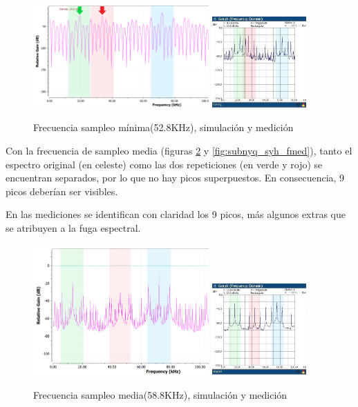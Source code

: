 \documentclass[../../ASSD_TP1_G7.tex]{subfiles}
\begin{document}
\begin{figure}[H]
\centering
{}
{\includegraphics[width=0.6\textwidth]{figures/simpto_8_syh_52,8_espectro.png}}
{\includegraphics[width=0.32\textwidth]{figures/syh_fmin.jpeg}}
\caption{Frecuencia sampleo mínima(52.8KHz), simulación y medición}
\label{fig:subnyq_syh_fmin}
\end{figure}


Con la frecuencia de sampleo media (figuras \ref{fig:subnyq_lla_fmed} y \ref{fig:subnyq_syh_fmed}), tanto el espectro original (en celeste) como las dos repeticiones (en verde y rojo) se encuentran separados, por lo que no hay picos superpuestos. En consecuencia, 9 picos deber\'ian ser visibles. 

En las mediciones se identifican con claridad los 9 picos, m\'as algunos extras que se atribuyen a la fuga espectral.

\begin{figure}[H]
\centering
{}
{\includegraphics[width=0.6\textwidth]{figures/simpto_8_llave_58,8_espectro.png}}
{\includegraphics[width=0.32\textwidth]{figures/lla_fmed.jpeg}}
\caption{Frecuencia sampleo media(58.8KHz), simulación y medición}
\label{fig:subnyq_lla_fmed}
\end{figure}
\end{document}

